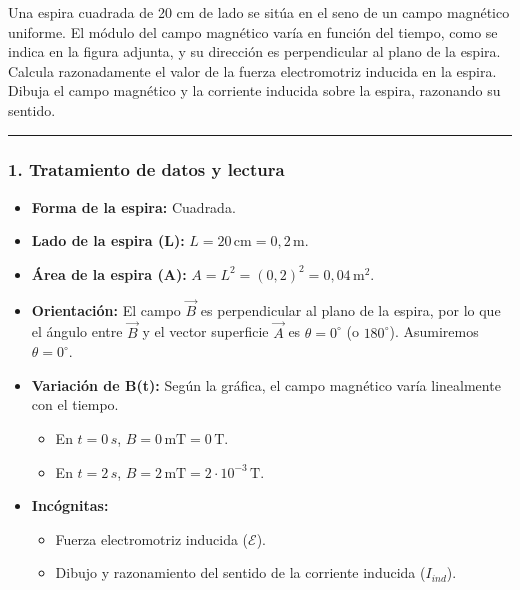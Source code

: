 \begin{cajaenunciado}
Una espira cuadrada de 20 cm de lado se sitúa en el seno de un campo magnético uniforme. El módulo del campo magnético varía en función del tiempo, como se indica en la figura adjunta, y su dirección es perpendicular al plano de la espira. Calcula razonadamente el valor de la fuerza electromotriz inducida en la espira. Dibuja el campo magnético y la corriente inducida sobre la espira, razonando su sentido.
\end{cajaenunciado}
\hrule

\subsubsection*{1. Tratamiento de datos y lectura}
\begin{itemize}
    \item \textbf{Forma de la espira:} Cuadrada.
    \item \textbf{Lado de la espira (L):} $L = 20 \, \text{cm} = 0,2 \, \text{m}$.
    \item \textbf{Área de la espira (A):} $A = L^2 = (0,2)^2 = 0,04 \, \text{m}^2$.
    \item \textbf{Orientación:} El campo $\vec{B}$ es perpendicular al plano de la espira, por lo que el ángulo entre $\vec{B}$ y el vector superficie $\vec{A}$ es $\theta=0^\circ$ (o $180^\circ$). Asumiremos $\theta=0^\circ$.
    \item \textbf{Variación de B(t):} Según la gráfica, el campo magnético varía linealmente con el tiempo.
    \begin{itemize}
        \item En $t=0 \, s$, $B=0 \, \text{mT} = 0 \, \text{T}$.
        \item En $t=2 \, s$, $B=2 \, \text{mT} = 2 \cdot 10^{-3} \, \text{T}$.
    \end{itemize}
    \item \textbf{Incógnitas:}
    \begin{itemize}
        \item Fuerza electromotriz inducida ($\mathcal{E}$).
        \item Dibujo y razonamiento del sentido de la corriente inducida ($I_{ind}$).
    \end{itemize}
\end{itemize}

